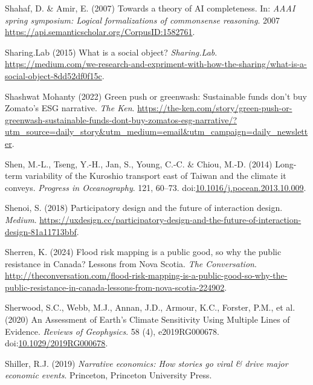 \documentclass[
  letterpaper,
  DIV=11,
  numbers=noendperiod]{scrartcl}
\newlength{\cslhangindent}
\newenvironment{CSLReferences}[2] %
 {\begin{list}{}{%
  \setlength{\itemindent}{0pt}
  \setlength{\leftmargin}{0pt}
  \setlength{\parsep}{0pt}
  \ifodd #1
   \setlength{\leftmargin}{\cslhangindent}
   \setlength{\itemindent}{-1\cslhangindent}
  \fi
  \setlength{\itemsep}{#2\baselineskip}}}
 {\end{list}}
\begin{document}
\begin{CSLReferences}{0}{1}
Shahaf, D. \& Amir, E. (2007) Towards a theory of {AI} completeness. In:
\emph{{AAAI} spring symposium: {Logical} formalizations of commonsense
reasoning}. 2007 \url{https://api.semanticscholar.org/CorpusID:1582761}.

Sharing.Lab (2015) What is a social object? \emph{Sharing.Lab}.
\url{https://medium.com/we-research-and-expriment-with-how-the-sharing/what-is-a-social-object-8dd52df0f15c}.

Shashwat Mohanty (2022) Green push or greenwash: Sustainable funds don't
buy {Zomato}'s {ESG} narrative. \emph{The Ken}.
\url{https://the-ken.com/story/green-push-or-greenwash-sustainable-funds-dont-buy-zomatos-esg-narrative/?utm_source=daily_story&utm_medium=email&utm_campaign=daily_newsletter}.

Shen, M.-L., Tseng, Y.-H., Jan, S., Young, C.-C. \& Chiou, M.-D. (2014)
Long-term variability of the {Kuroshio} transport east of {Taiwan} and
the climate it conveys. \emph{Progress in Oceanography}. 121, 60--73.
doi:\href{https://doi.org/10.1016/j.pocean.2013.10.009}{10.1016/j.pocean.2013.10.009}.

Shenoi, S. (2018) Participatory design and the future of interaction
design. \emph{Medium}.
\url{https://uxdesign.cc/participatory-design-and-the-future-of-interaction-design-81a11713bbf}.

Sherren, K. (2024) Flood risk mapping is a public good, so why the
public resistance in {Canada}? {Lessons} from {Nova Scotia}. \emph{The
Conversation}.
\url{http://theconversation.com/flood-risk-mapping-is-a-public-good-so-why-the-public-resistance-in-canada-lessons-from-nova-scotia-224902}.

Sherwood, S.C., Webb, M.J., Annan, J.D., Armour, K.C., Forster, P.M., et
al. (2020) An {Assessment} of {Earth}'s {Climate Sensitivity Using
Multiple Lines} of {Evidence}. \emph{Reviews of Geophysics}. 58 (4),
e2019RG000678.
doi:\href{https://doi.org/10.1029/2019RG000678}{10.1029/2019RG000678}.

Shiller, R.J. (2019) \emph{Narrative economics: How stories go viral \&
drive major economic events}. Princeton, Princeton University Press.


\end{CSLReferences}
\end{document}
